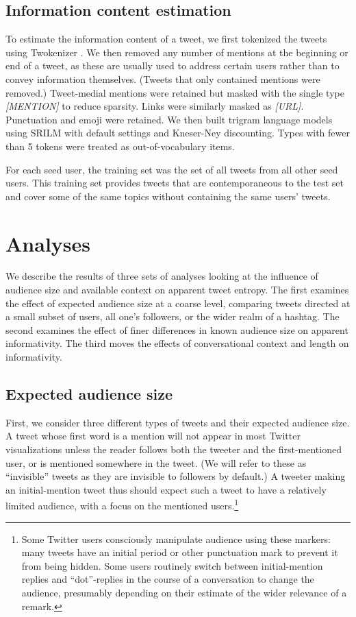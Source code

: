 \documentclass[11pt,letterpaper]{article}
\begin{document}
\subsection{Information content estimation}

To estimate the information content of a tweet, we first tokenized the tweets using Twokenizer \cite{owoputi2013}. We then removed any number of mentions at the beginning or end of a tweet, as these are usually used to address certain users rather than to convey information themselves. (Tweets that only contained mentions were removed.)  Tweet-medial mentions were retained but masked with the single type {\it [MENTION]} to reduce sparsity. Links were similarly masked as {\it [URL]}. Punctuation and emoji were retained. We then built trigram language models using SRILM with default settings and Kneser-Ney discounting.  Types with fewer than 5 tokens were treated as out-of-vocabulary items. 

For each seed user, the training set was the set of all tweets from all other seed users.  This training set provides tweets that are contemporaneous to the test set and cover some of the same topics without containing the same users' tweets.

\section{Analyses}

We describe the results of three sets of analyses looking at the influence of audience size and available context on apparent tweet entropy. The first examines the effect of expected audience size at a coarse level, comparing tweets directed at a small subset of users, all one's followers, or the wider realm of a hashtag.   The second examines the effect of finer differences in known audience size on apparent informativity.  The third moves the effects of conversational context and length on informativity.

\subsection{Expected audience size}
\label{sec:expected}

First, we consider three different types of tweets and their expected audience size.  A tweet whose first word is a mention will not appear in most Twitter visualizations unless the reader follows both the tweeter and the first-mentioned user, or is mentioned somewhere in the tweet. (We will refer to these as ``invisible'' tweets as they are invisible to followers by default.)  A tweeter making an initial-mention tweet thus should expect such a tweet to have a relatively limited audience, with a focus on the mentioned users.\footnote{Some Twitter users consciously manipulate audience using these markers: many tweets have an initial period or other punctuation mark to prevent it from being hidden. Some users routinely switch between initial-mention replies and ``dot''-replies in the course of a conversation to change the audience, presumably depending on their estimate of the wider relevance of a remark.}
\end{document}
